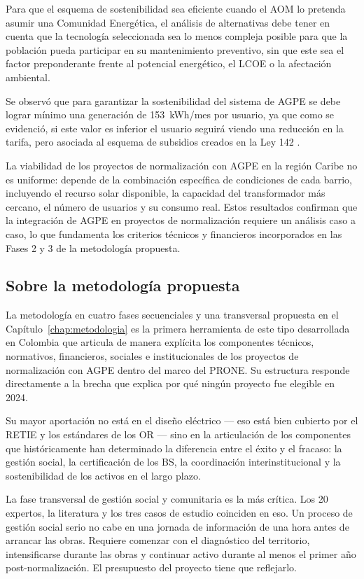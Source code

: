 Para que el esquema de sostenibilidad sea eficiente cuando el AOM lo
pretenda asumir una Comunidad Energética, el análisis de alternativas
debe tener en cuenta que la tecnología seleccionada sea lo menos
compleja posible para que la población pueda participar en su
mantenimiento preventivo, sin que este sea el factor preponderante
frente al potencial energético, el LCOE o la afectación ambiental.

Se observó que para garantizar la sostenibilidad del sistema de AGPE se
debe lograr mínimo una generación de 153~kWh/mes por usuario, ya que
como se evidenció, si este valor es inferior el usuario seguirá viendo
una reducción en la tarifa, pero asociada al esquema de subsidios
creados en la Ley 142 \parencite{Ley142_1994}.

La viabilidad de los proyectos de normalización con AGPE en la región
Caribe no es uniforme: depende de la combinación específica de
condiciones de cada barrio, incluyendo el recurso solar disponible,
la capacidad del transformador más cercano, el número de usuarios y su
consumo real. Estos resultados confirman que la integración de AGPE en
proyectos de normalización requiere un análisis caso a caso, lo que
fundamenta los criterios técnicos y financieros incorporados en las
Fases 2 y 3 de la metodología propuesta.

\subsection{Sobre la metodología propuesta}
\label{subsec:conc_metodologia}

La metodología en cuatro fases secuenciales y una transversal propuesta
en el Capítulo~\ref{chap:metodologia} es la primera herramienta de este
tipo desarrollada en Colombia que articula de manera explícita los
componentes técnicos, normativos, financieros, sociales e
institucionales de los proyectos de normalización con AGPE dentro del
marco del PRONE. Su estructura responde directamente a la brecha que
explica por qué ningún proyecto fue elegible en 2024.

Su mayor aportación no está en el diseño eléctrico — eso está bien
cubierto por el RETIE y los estándares de los OR — sino en la
articulación de los componentes que históricamente han determinado la
diferencia entre el éxito y el fracaso: la gestión social, la
certificación de los BS, la coordinación interinstitucional y la
sostenibilidad de los activos en el largo plazo.

La fase transversal de gestión social y comunitaria es la más crítica.
Los 20 expertos, la literatura y los tres casos de estudio coinciden
en eso. Un proceso de gestión social serio no cabe en una jornada de
información de una hora antes de arrancar las obras. Requiere comenzar
con el diagnóstico del territorio, intensificarse durante las obras y
continuar activo durante al menos el primer año post-normalización. El
presupuesto del proyecto tiene que reflejarlo.

